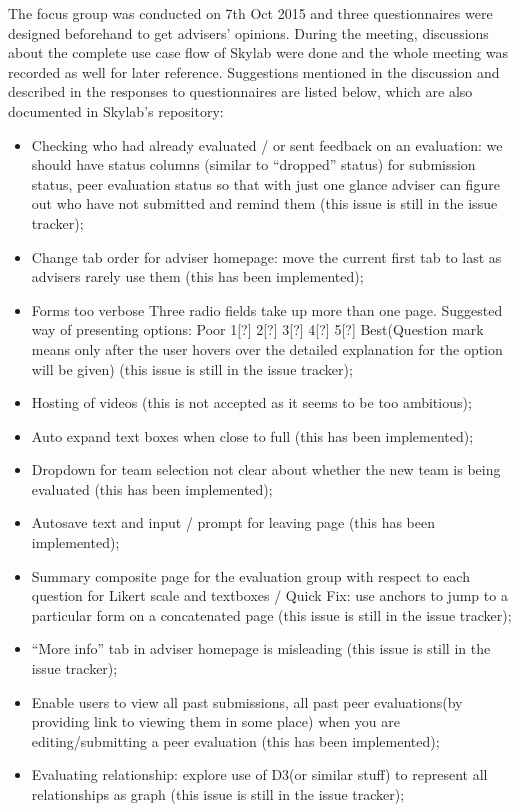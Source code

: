 The focus group was conducted on 7th Oct 2015 and three questionnaires were designed beforehand to get advisers' opinions. During the meeting, discussions about the complete use case flow of Skylab were done and the whole meeting was recorded as well for later reference. Suggestions mentioned in the discussion and described in the responses to questionnaires are listed below, which are also documented in Skylab's repository\cite{citationskylabfocusgroup}:

\begin{itemize}
  \item Checking who had already evaluated / or sent feedback on an evaluation: we should have status columns (similar to ``dropped'' status) for submission status, peer evaluation status so that with just one glance adviser can figure out who have not submitted and remind them (this issue is still in the issue tracker);
  \item Change tab order for adviser homepage: move the current first tab to last as advisers rarely use them (this has been implemented);
  \item Forms too verbose Three radio fields take up more than one page. Suggested way of presenting options: Poor 1[?] 2[?] 3[?] 4[?] 5[?] Best(Question mark means only after the user hovers over the detailed explanation for the option will be given) (this issue is still in the issue tracker);
  \item Hosting of videos (this is not accepted as it seems to be too ambitious);
  \item Auto expand text boxes when close to full (this has been implemented);
  \item Dropdown for team selection not clear about whether the new team is being evaluated (this has been implemented);
  \item Autosave text and input / prompt for leaving page (this has been implemented);
  \item Summary composite page for the evaluation group with respect to each question for Likert scale and textboxes / Quick Fix: use anchors to jump to a particular form on a concatenated page (this issue is still in the issue tracker);
  \item ``More info'' tab in adviser homepage is misleading (this issue is still in the issue tracker);
  \item Enable users to view all past submissions, all past peer evaluations(by providing link to viewing them in some place) when you are editing/submitting a peer evaluation (this has been implemented);
  \item Evaluating relationship: explore use of D3(or similar stuff) to represent all relationships as graph (this issue is still in the issue tracker);
\end{itemize}
